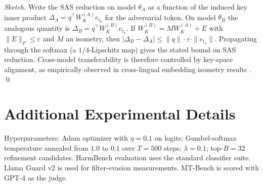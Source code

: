 \documentclass[sigconf,anonymous=false,review=false]{acmart}
\theoremstyle{definition}
\theoremstyle{remark}
\newcommand{\SAS}{\mathrm{SAS}}
\begin{document}
\emph{Sketch.} Write the $\SAS$ reduction on model $\theta_A$ as a function of the induced key inner product $\Delta_A = q^\top W_K^{(A)} e_{t_a}$ for the adversarial token. On model $\theta_B$ the analogous quantity is $\Delta_B = q^\top W_K^{(B)} e_{t_a}$. If $W_K^{(B)} = M W_K^{(A)} + E$ with $\|E\|_F \leq \varepsilon$ and $M$ an isometry, then $|\Delta_B - \Delta_A| \leq \|q\| \cdot \varepsilon \cdot \|e_{t_a}\|$. Propagating through the softmax (a $1/4$-Lipschitz map) gives the stated bound on $\SAS$ reduction. Cross-model transferability is therefore controlled by key-space alignment, as empirically observed in cross-lingual embedding isometry results \cite{artetxe2018robust}. \qed

\section{Additional Experimental Details}
\label{app:exp}

Hyperparameters: Adam optimizer with $\eta = 0.1$ on logits; Gumbel-softmax temperature annealed from $1.0$ to $0.1$ over $T{=}500$ steps; $\lambda = 0.1$; top-$B = 32$ refinement candidates. HarmBench evaluation uses the standard classifier suite. Llama Guard v2 is used for filter-evasion measurements. MT-Bench is scored with GPT-4 as the judge.
\end{document}
